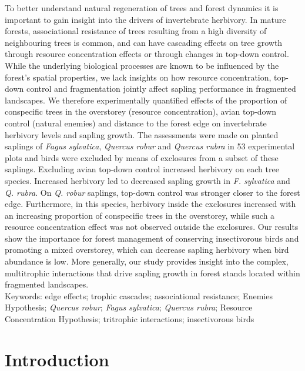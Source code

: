 \documentclass[b5paper,10pt]{book} %
\begin{document}
\begin{small}
	To better understand natural regeneration of trees and forest dynamics it is important to gain insight into the drivers of invertebrate herbivory. In mature forests, associational resistance of trees resulting from a high diversity of neighbouring trees is common, and can have cascading effects on tree growth through resource concentration effects or through changes in top-down control. While the underlying biological processes are known to be influenced by the forest’s spatial properties, we lack insights on how resource concentration, top-down control and fragmentation jointly affect sapling performance in fragmented landscapes. We therefore experimentally quantified effects of the proportion of conspecific trees in the overstorey (resource concentration), avian top-down control (natural enemies) and distance to the forest edge on invertebrate herbivory levels and sapling growth. The assessments were made on planted saplings of \textit{Fagus sylvatica}, \textit{Quercus robur} and \textit{Quercus rubra} in 53 experimental plots and birds were excluded by means of exclosures from a subset of these saplings. Excluding avian top-down control increased herbivory on each tree species. Increased herbivory led to decreased sapling growth in \textit{F. sylvatica} and \textit{Q. rubra}. On \textit{Q. robur} saplings, top-down control was stronger closer to the forest edge. Furthermore, in this species, herbivory inside the exclosures increased with an increasing proportion of conspecific trees in the overstorey, while such a resource concentration effect was not observed outside the exclosures. Our results show the importance for forest management of conserving insectivorous birds and promoting a mixed overstorey, which can decrease sapling herbivory when bird abundance is low. More generally, our study provides insight into the complex, multitrophic interactions that drive sapling growth in forest stands located within fragmented landscapes.\\

	\vspace{1.0cm}
Keywords: edge effects; trophic cascades; associational resistance; Enemies Hypothesis; \textit{Quercus robur}; \textit{Fagus sylvatica}; \textit{Quercus rubra}; Resource Concentration Hypothesis; tritrophic interactions; insectivorous birds\\
\end{small}

\newpage

	\section{Introduction}
\end{document}
